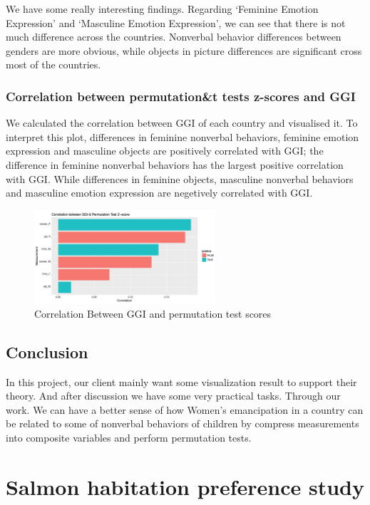 \documentclass{article}
\begin{document}
	We have some really interesting findings. Regarding ‘Feminine Emotion Expression’ and ‘Masculine Emotion Expression’, we can see that there is not much difference across the countries. Nonverbal behavior differences between genders are more obvious, while objects in picture differences are significant cross most of the countries.
	\subsubsection{Correlation between permutation\&t tests z-scores and GGI}
	We calculated the correlation between GGI of each country and visualised it. To interpret this plot, differences in feminine nonverbal behaviors, feminine emotion expression and masculine objects are positively correlated with GGI; the difference in feminine nonverbal behaviors has the largest positive correlation with GGI. While differences in feminine objects, masculine nonverbal behaviors and masculine emotion expression are negetively correlated with GGI.
	
	\begin{figure}[h]
		\centering
		\includegraphics[width=0.6\textwidth]{CatalogCorrelation}
		\caption{Correlation Between GGI and permutation test scores}
	\end{figure}
	
	\subsection{Conclusion}
	In this project, our client mainly want some visualization result to support their theory. And after discussion we have some very practical tasks. Through our work. We can have a better sense of how Women's emancipation in a country can be related to some of nonverbal behaviors of children by compress measurements into composite variables and perform permutation tests.
	
	\section{Salmon habitation preference study}
\end{document}
